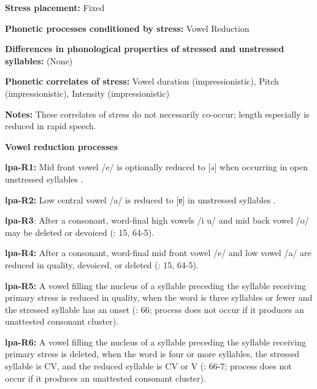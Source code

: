 \textbf{Stress placement:} Fixed



\textbf{Phonetic processes conditioned by stress:} Vowel Reduction



\textbf{Differences in phonological properties of stressed and unstressed syllables:} (None)



\textbf{Phonetic correlates of stress:} Vowel duration (impressionistic), Pitch (impressionistic), Intensity (impressionistic)



\textbf{Notes:} These correlates of stress do not necessarily co-occur; length especially is reduced in rapid speech.



\textbf{Vowel reduction processes}



\textbf{lpa-R1:} Mid front vowel /e/ is optionally reduced to [ə] when occurring in open unstressed syllables \citep[34]{Lacrampe2014}.



\textbf{lpa-R2:} Low central vowel /a/ is reduced to [ɐ] in unstressed syllables \citep[34-5]{Lacrampe2014}.



\textbf{lpa-R3}: After a consonant, word-final high vowels /i u/ and mid back vowel /o/ may be deleted or devoiced (\citealt{Lacrampe2014}: 15, 64-5).



\textbf{lpa-R4:} After a consonant, word-final mid front vowel /e/ and low vowel /a/ are reduced in quality, devoiced, or deleted (\citealt{Lacrampe2014}: 15, 64-5).



\textbf{lpa-R5:} A vowel filling the nucleus of a syllable preceding the syllable receiving primary stress is reduced in quality, when the word is three syllables or fewer and the stressed syllable has an onset (\citealt{Lacrampe2014}: 66; process does not occur if it produces an unattested consonant cluster).



\textbf{lpa-R6:} A vowel filling the nucleus of a syllable preceding the syllable receiving primary stress is deleted, when the word is four or more syllables, the stressed syllable is CV, and the reduced syllable is CV or V (\citealt{Lacrampe2014}: 66-7; process does not occur if it produces an unattested consonant cluster).



